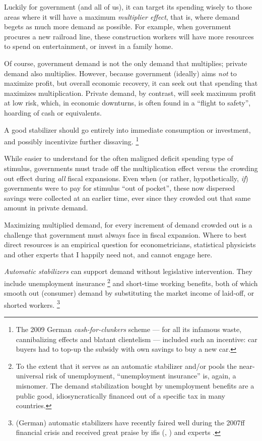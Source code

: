 Luckily for government (and all of us), it can target its spending wisely to those areas where it will have a maximum \emph{multiplier effect}, that is, where demand begets as much more demand as possible.
For example, when government procures a new railroad line, these construction workers will have more resources to spend on entertainment, or invest in a family home.

Of course, government demand is not the only demand that multiplies;
private demand also multiplies.
However, because government (ideally) aims \emph{not} to maximize profit, but overall economic recovery, it can seek out that spending that maximizes multiplication.
Private demand, by contrast, will seek maximum profit at low risk, which, in economic downturns, is often found in a ``flight to safety'', hoarding of cash or equivalents.

A good stabilizer should go entirely into immediate consumption or investment, and possibly incentivize further dissaving.
\footnote{
	The 2009 German \emph{cash-for-clunkers} scheme --- for all its infamous waste, cannibalizing effects and blatant clientelism --- included such an incentive:
	car buyers had to top-up the subsidy with own savings to buy a new car.
}

While easier to understand for the often maligned deficit spending type of stimulus, governments must trade off the multiplication effect versus the crowding out effect during \emph{all} fiscal expansions.
Even when (or rather, hypothetically, \emph{if}) governments were to pay for stimulus ``out of pocket'', these now dispersed savings were collected at an earlier time, ever since they crowded out that same amount in private demand.

Maximizing multiplied demand, for every increment of demand crowded out is a challenge that government must always face in fiscal expansion.
Where to best direct resources is an empirical question for econometricians, statistical physicists and other experts that I happily need not, and cannot engage here.


\emph{Automatic stabilizers}
can support demand without legislative intervention.
They include unemployment insurance
\footnote{
	To the extent that it serves as an automatic stabilizer and/or pools the near-universal risk of unemployment, ``unemployment insurance'' is, again, a misnomer.
	The demand stabilization bought by unemployment benefits are a public good, idiosyncratically financed out of a specific tax in many countries.
}
and short-time working benefits, both of which smooth out (consumer) demand by substituting the market income of laid-off, or shorted workers.
\footnote{
	(German) automatic stabilizers have recently faired well during the 2007ff financial crisis and received great praise by \glspl{ifi} (\citealt[20]{IMF-2008-ab}, \citealt[19]{WorldBank2008}) and experts \citep[8]{BofingerFranz-2007-aa}.
}

